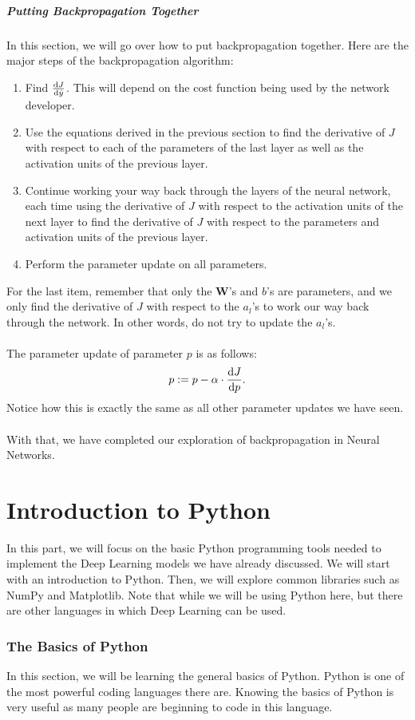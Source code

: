 \documentclass{article}
\begin{document}
\subsubsection{Putting Backpropagation Together}
In this section, we will go over how to put backpropagation together. Here are the major steps of the backpropagation algorithm:
\begin{enumerate}
    \item Find $\diff{J}{\hat{y}}$. This will depend on the cost function being used by the network developer.
    \item Use the equations derived in the previous section to find the derivative of $J$ with respect to each of the parameters of the last layer as well as the activation units of the previous layer. 
    \item Continue working your way back through the layers of the neural network, each time using the derivative of $J$ with respect to the activation units of the next layer to find the derivative of $J$ with respect to the parameters and activation units of the previous layer.
    \item Perform the parameter update on all parameters.
\end{enumerate}
For the last item, remember that only the \textbf{W}'s and $b$'s are parameters, and we only find the derivative of $J$ with respect to the $a_l$'s to work our way back through the network. In other words, do not try to update the $a_l$'s. 
\\
\\
The parameter update of parameter $p$ is as follows:
\[p:=p-\alpha\cdot \diff{J}{p}.\]
Notice how this is exactly the same as all other parameter updates we have seen. 
\\
\\
With that, we have completed our exploration of backpropagation in Neural Networks.

\clearpage
\part{Introduction to Python}
\clearpage
In this part, we will focus on the basic Python programming tools needed to implement the Deep Learning models we have already discussed. We will start with an introduction to Python. Then, we will explore common libraries such as NumPy and Matplotlib. Note that while we will be using Python here, but there are other languages in which Deep Learning can be used. 
\section{The Basics of Python}
In this section, we will be learning the general basics of Python. Python is one of the most powerful coding languages there are. Knowing the basics of Python is very useful as many people are beginning to code in this language. 
\end{document}

